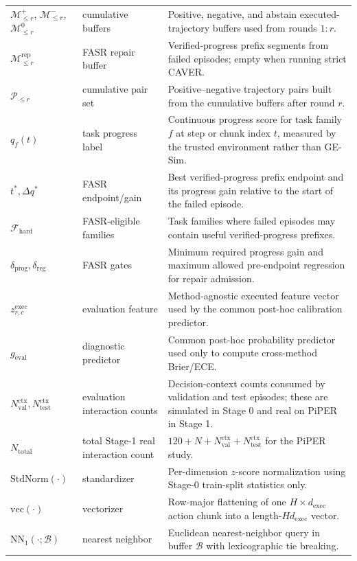 \documentclass[10pt]{article}
\theoremstyle{plain}
\theoremstyle{definition}
\theoremstyle{remark}
\begin{document}
{\begin{longtable}{@{}>{\raggedright\arraybackslash}p{3.25cm}>{\raggedright\arraybackslash}p{2.55cm}>{\raggedright\arraybackslash}p{8.35cm}@{}}
\(\mathcal M_{\le r}^{+}\), \(\mathcal M_{\le r}^{-}\), \(\mathcal M_{\le r}^{0}\) & cumulative buffers & Positive, negative, and abstain executed-trajectory buffers used from rounds $1{:}r$. \\
$\mathcal M_{\le r}^{\mathrm{rep}}$ & FASR repair buffer & Verified-progress prefix segments from failed episodes; empty when running strict CAVER. \\
$\mathcal P_{\le r}$ & cumulative pair set & Positive--negative trajectory pairs built from the cumulative buffers after round $r$. \\
$q_f(t)$ & task progress label & Continuous progress score for task family $f$ at step or chunk index $t$, measured by the trusted environment rather than GE-Sim. \\
$t^*,\Delta q^*$ & FASR endpoint/gain & Best verified-progress prefix endpoint and its progress gain relative to the start of the failed episode. \\
$\mathcal F_{\mathrm{hard}}$ & FASR-eligible families & Task families where failed episodes may contain useful verified-progress prefixes. \\
$\delta_{\mathrm{prog}},\delta_{\mathrm{reg}}$ & FASR gates & Minimum required progress gain and maximum allowed pre-endpoint regression for repair admission. \\
$z^{\mathrm{exec}}_{r,c}$ & evaluation feature & Method-agnostic executed feature vector used by the common post-hoc calibration predictor. \\
$g_{\mathrm{eval}}$ & diagnostic predictor & Common post-hoc probability predictor used only to compute cross-method Brier/ECE. \\
$N_{\mathrm{val}}^{\mathrm{ctx}},N_{\mathrm{test}}^{\mathrm{ctx}}$ & evaluation interaction counts & Decision-context counts consumed by validation and test episodes; these are simulated in Stage 0 and real on PiPER in Stage 1. \\
$N_{\mathrm{total}}$ & total Stage-1 real interaction count & $120+N+N_{\mathrm{val}}^{\mathrm{ctx}}+N_{\mathrm{test}}^{\mathrm{ctx}}$ for the PiPER study. \\
$\mathrm{StdNorm}(\cdot)$ & standardizer & Per-dimension $z$-score normalization using Stage-0 train-split statistics only. \\
$\mathrm{vec}(\cdot)$ & vectorizer & Row-major flattening of one $H\times d_{\mathrm{exec}}$ action chunk into a length-$Hd_{\mathrm{exec}}$ vector. \\
$\mathrm{NN}_1(\cdot;\mathcal B)$ & nearest neighbor & Euclidean nearest-neighbor query in buffer $\mathcal B$ with lexicographic tie breaking. \\
\bottomrule
\end{longtable}
}
\end{document}
